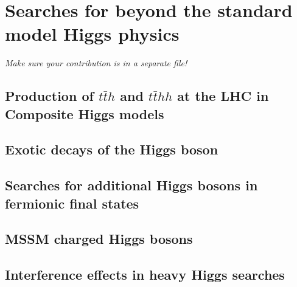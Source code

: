 \documentclass[../report.tex]{subfiles}
\providecommand{\main}{..}
\begin{document}
\section{Searches for beyond the standard model Higgs physics}

\emph{Make sure your contribution is in a separate file!}

%

\subsection{Production of $t\bar{t}h$ and $t\bar{t}h h$ at the LHC in Composite Higgs models}


\subsection{Exotic decays of the Higgs boson}



%

\subsection{Searches for additional Higgs bosons in fermionic final states}





\subsection{MSSM charged Higgs bosons}


\subsection{Interference effects in heavy Higgs searches}

\end{document}
